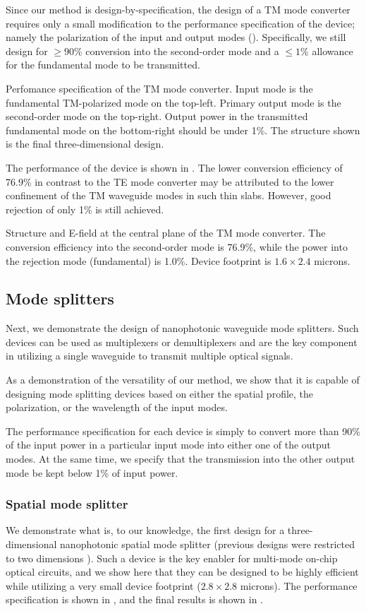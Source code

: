 Since our method is design-by-specification, 
    the design of a TM mode converter requires only
    a small modification to the performance specification of the device;
    namely the polarization of the input and output modes ().
Specifically, we still design for 
    $\ge 90\%$ conversion into the second-order mode and 
    a $\le 1\%$ allowance for the fundamental mode to be transmitted.

    {Perfomance specification of the TM mode converter.
    Input mode is the fundamental TM-polarized mode on the top-left.
    Primary output mode is the second-order mode on the top-right.
    Output power in the transmitted fundamental mode on the bottom-right 
    should be under 1\%.
    The structure shown is the final three-dimensional design.}
    
The performance of the device is shown in .
The lower conversion efficiency of 76.9\% in contrast to the TE mode converter
    may be attributed to the lower confinement of the TM waveguide modes 
    in such thin slabs.
However, good rejection of only 1\% is still achieved.

    {Structure and E-field at the central plane of the TM mode converter.
    The conversion efficiency into the second-order mode is 76.9\%,
    while the power into the rejection mode (fundamental) is 1.0\%.
    Device footprint is $1.6\times2.4$ microns.}

\subsection{Mode splitters}
Next, we demonstrate the design of nanophotonic waveguide mode splitters.
Such devices can be used as multiplexers or demultiplexers and
    are the key component in utilizing a single waveguide to transmit 
    multiple optical signals.

As a demonstration of the versatility of our method, 
    we show that it is capable of designing mode splitting devices 
    based on either the spatial profile, the polarization, or the wavelength
    of the input modes.

The performance specification for each device is simply to convert
    more than 90\% of the input power in a particular input mode into
    either one of the output modes.
At the same time, we specify that the transmission into the other output mode 
    be kept below 1\% of input power.

\subsubsection{Spatial mode splitter}
We demonstrate what is, to our knowledge, 
    the first design for a three-dimensional
    nanophotonic spatial mode splitter 
    (previous designs were restricted to two dimensions \cite{Jiao05}).
Such a device is the key enabler for multi-mode on-chip optical circuits,
    and we show here that they can be designed to be highly efficient
    while utilizing a very small device footprint ($2.8\times2.8$ microns). 
The performance specification is shown in ,
    and the final results is shown in .

